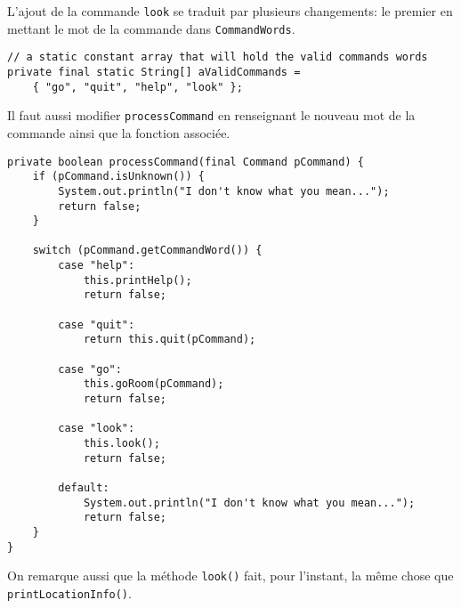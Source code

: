\begin{exercise}[subtitle=Commande look]

L'ajout de la commande \verb|look| se traduit par plusieurs changements: le premier en mettant le mot de la commande dans \verb|CommandWords|.

\begin{verbatim}
// a static constant array that will hold the valid commands words
private final static String[] aValidCommands = 
    { "go", "quit", "help", "look" };
\end{verbatim}

Il faut aussi modifier \verb|processCommand| en renseignant le nouveau mot de la commande ainsi que la fonction associée.

\begin{verbatim}
private boolean processCommand(final Command pCommand) {
    if (pCommand.isUnknown()) {
        System.out.println("I don't know what you mean...");
        return false;
    }

    switch (pCommand.getCommandWord()) {
        case "help":
            this.printHelp();
            return false;

        case "quit":
            return this.quit(pCommand);

        case "go":
            this.goRoom(pCommand);
            return false;

        case "look":
            this.look();
            return false;

        default:
            System.out.println("I don't know what you mean...");
            return false;
    }
}
\end{verbatim}

On remarque aussi que la méthode \verb|look()| fait, pour l'instant, la même chose que \verb|printLocationInfo()|. 
\end{exercise}

